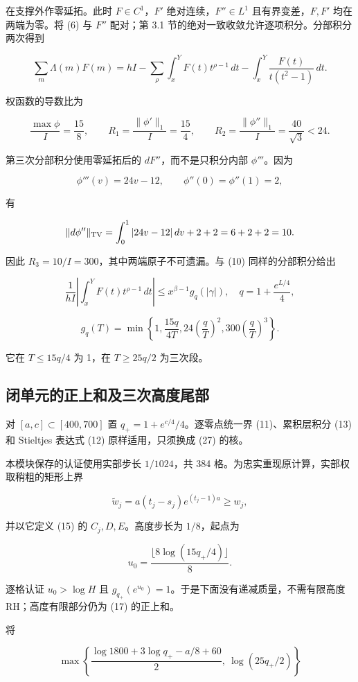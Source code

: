 \documentclass[UTF8,zihao=-4,fontset=fandol]{ctexart}
\begin{document}
在支撑外作零延拓。此时 \(F\in C^1\)，\(F'\) 绝对连续，\(F''\in L^1\) 且有界变差，\(F,F'\) 均在两端为零。将 (6) 与 \(F''\) 配对；第 3.1 节的绝对一致收敛允许逐项积分。分部积分两次得到

\[
\sum_m\Lambda(m)F(m)
=hI-\sum_\rho\int_x^YF(t)t^{\rho-1}\,dt
-\int_x^Y\frac{F(t)}{t(t^2-1)}\,dt. \tag{26}
\]

权函数的导数比为

\[
\frac{\max\phi}{I}=\frac{15}{8},\qquad
R_1=\frac{\|\phi'\|_1}{I}=\frac{15}{4},\qquad
R_2=\frac{\|\phi''\|_1}{I}=\frac{40}{\sqrt3}<24.
\]

第三次分部积分使用零延拓后的 \(dF''\)，而不是只积分内部 \(\phi'''\)。因为

\[
\phi'''(v)=24v-12,\qquad
\phi''(0)=\phi''(1)=2,
\]

有

\[
\|d\phi''\|_{\rm TV}
=\int_0^1|24v-12|\,dv+2+2=6+2+2=10.
\]

因此 \(R_3=10/I=300\)，其中两端原子不可遗漏。与 (10) 同样的分部积分给出

\[
\frac1{hI}\left|\int_x^YF(t)t^{\rho-1}\,dt\right|
\le x^{\beta-1}g_q(|\gamma|),
\quad q=1+\frac{e^{L/4}}4,
\]

\[
g_q(T)=\min\left\{1,\frac{15q}{4T},24\left(\frac qT\right)^2,
300\left(\frac qT\right)^3\right\}. \tag{27}
\]

它在 \(T\le15q/4\) 为 1，在 \(T\ge25q/2\) 为三次段。

\subsection{闭单元的正上和及三次高度尾部}

对 \([a,c]\subset[400,700]\) 置 \(q_+=1+e^{c/4}/4\)。逐零点统一界 (11)、累积层积分 (13) 和 Stieltjes 表达式 (12) 原样适用，只须换成 (27) 的核。

本模块保存的认证使用实部步长 \(1/1024\)，共 384 格。为忠实重现原计算，实部权取稍粗的矩形上界

\[
\widetilde w_j=a(t_j-s_j)e^{(t_j-1)a}\ge w_j, \tag{28}
\]

并以它定义 (15) 的 \(C_j,D,E\)。高度步长为 \(1/8\)，起点为

\[
u_0=\frac{\lfloor8\log(15q_+/4)\rfloor}{8}.
\]

逐格认证 \(u_0>\log H\) 且 \(g_{q_+}(e^{u_0})=1\)。于是下面没有递减质量，不需有限高度 RH；高度有限部分仍为 (17) 的正上和。

将

\[
\max\left\{
\frac{\log1800+3\log q_+-a/8+60}{2},\ 
\log(25q_+/2)
\right\}
\]
\end{document}
